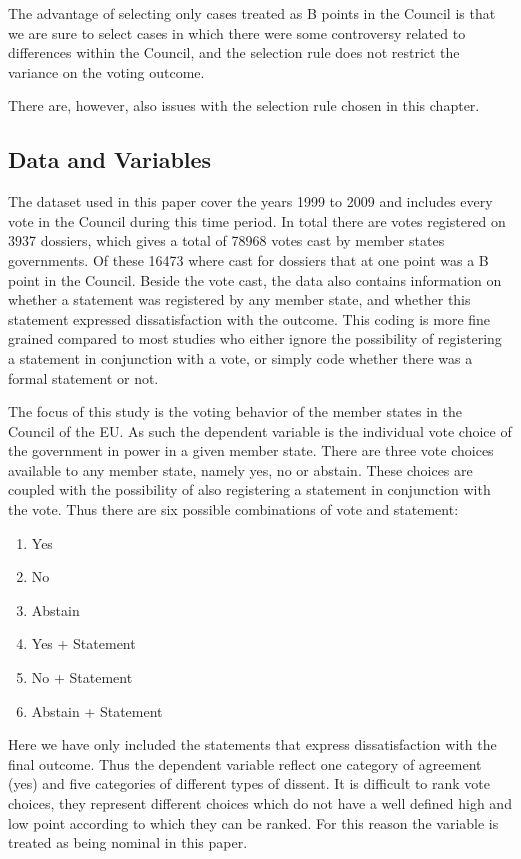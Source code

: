 The advantage of selecting only cases treated as B points in the Council is that we are sure to select cases in which there were some controversy related to differences within the Council, and the selection rule does not restrict the variance on the voting outcome. 

There are, however, also issues with the selection rule chosen in this chapter. 

\subsection{Data and Variables}
The dataset used in this paper cover the years 1999 to 2009 and includes every vote in the Council during this time period. In total there are votes registered on 3937 dossiers, which gives a total of 78968 votes cast by member states governments. Of these 16473 where cast for dossiers that at one point was a B point in the Council. Beside the vote cast, the data also contains information on whether a statement was registered by any member state, and whether this statement expressed dissatisfaction with the outcome. This coding is more fine grained compared to most studies who either ignore the possibility of registering a statement in conjunction with a vote, or simply code whether there was a formal statement or not.

The focus of this study is the voting behavior of the member states in the Council of the EU. As such the dependent variable is the individual vote choice of the government in power in a given member state. There are three vote choices available to any member state, namely yes, no or abstain. These choices are coupled with the possibility of also registering a statement in conjunction with the vote. Thus there are six possible combinations of vote and statement:

\begin{enumerate}
\item Yes
\item No
\item Abstain
\item Yes + Statement
\item No + Statement
\item Abstain + Statement
\end{enumerate}

Here we have only included the statements that express dissatisfaction with the final outcome. Thus the dependent variable reflect one category of agreement (yes) and five categories of different types of dissent. It is difficult to rank vote choices, they represent different choices which do not have a well defined high and low point according to which they can be ranked. For this reason the variable is treated as being nominal in this paper. 

